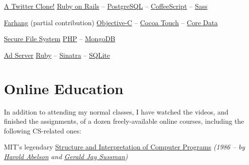 \documentclass{tccv}
\begin{document}
{{\begin{oneline_projects}
\item{\href{https://github.com/pooriaazimi/twitter}{A Twitter Clone!}}
	 {%
		 \href{http://rubyonrails.org}{Ruby on Rails} -- 
		 \href{http://www.postgresql.org}{PostgreSQL} -- 
		 \href{http://coffeescript.org}{CoffeeScript} -- 
		 \href{http://sass-lang.com}{Sass}%
	 }


\item{\href{http://www.turnedondigital.com/?portfolio=farhang-iphone-app}{Farhang} \large{(partial contribution)}}
	 {%
	 	\href{https://en.wikipedia.org/wiki/Objective-C}{Objective-C} -- 
		\href{https://en.wikipedia.org/wiki/Cocoa_Touch}{Cocoa Touch} -- 
		\href{https://en.wikipedia.org/wiki/Core_Data}{Core Data}%
	 }

\item{\href{https://github.com/pooriaazimi/secure_file_system}{Secure File System}}
	 {%
		 \href{http://php.net}{PHP} -- 
		 \href{http://www.mongodb.org}{MongoDB}%
	 }

\item{\href{https://github.com/pooriaazimi/adserver}{Ad Server}}
	 {%
	 	\href{https://www.ruby-lang.org/en/}{Ruby} -- 
		\href{http://www.sinatrarb.com}{Sinatra} -- 
		\href{http://www.sqlite.org}{SQLite}%
	 }


\end{oneline_projects}












\section{Online Education}

In addition to attending my normal classes, I have watched the videos, and finished the assignments, of a dozen freely-available online courses, \mbox{including} the following CS-related ones:

\begin{list}{}{\leftmargin=1em}

\item MIT's legendary \href{http://groups.csail.mit.edu/mac/classes/6.001/abelson-sussman-lectures/}{Structure and Interpretation of Computer Programs} {\it(1986 -- by \href{https://en.wikipedia.org/wiki/Hal_Abelson}{Harold Abelson} and \href{https://en.wikipedia.org/wiki/Gerald_Jay_Sussman}{Gerald Jay Sussman})}


\end{list}}}
\end{document}
